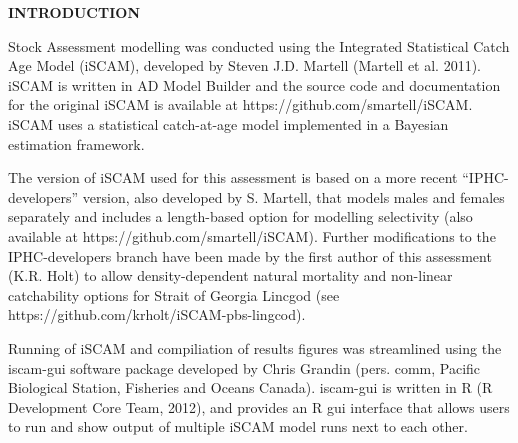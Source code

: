 \documentclass[11pt]{article}   %
\def\AppLet{E}                   %
\def\StartP{109}                 %
\begin{document}
   
\setcounter{page}{\StartP}

\begin{center}
\noindent {\bf \large APPENDIX~\AppLet.~~MODEL EQUATIONS}
\end{center}



{\bf INTRODUCTION}

 Stock Assessment modelling was conducted using the Integrated Statistical Catch Age Model (iSCAM), developed by Steven J.D. Martell (Martell et al. 2011).  iSCAM is written in AD Model Builder and the source code and documentation for the original iSCAM is available at https://github.com/smartell/iSCAM.  iSCAM uses a statistical catch-at-age model implemented in a Bayesian estimation framework.  

The version of iSCAM used for this assessment is based on a more recent “IPHC-developers” version, also developed by S. Martell, that models males and females separately and includes a length-based option for modelling selectivity (also available at https://github.com/smartell/iSCAM).  Further modifications to the IPHC-developers branch have been made by the first author of this assessment (K.R. Holt) to allow density-dependent natural mortality and non-linear catchability options for Strait of Georgia Lincgod (see https://github.com/krholt/iSCAM-pbs-lingcod).


Running of iSCAM and compiliation of results figures was streamlined using the iscam-gui software package developed by Chris Grandin (pers. comm, Pacific Biological Station, Fisheries and Oceans Canada).  iscam-gui is written in R (R Development Core Team, 2012), and provides an R gui interface that allows users to run and show output of multiple iSCAM model runs next to each other.  
\end{document}
